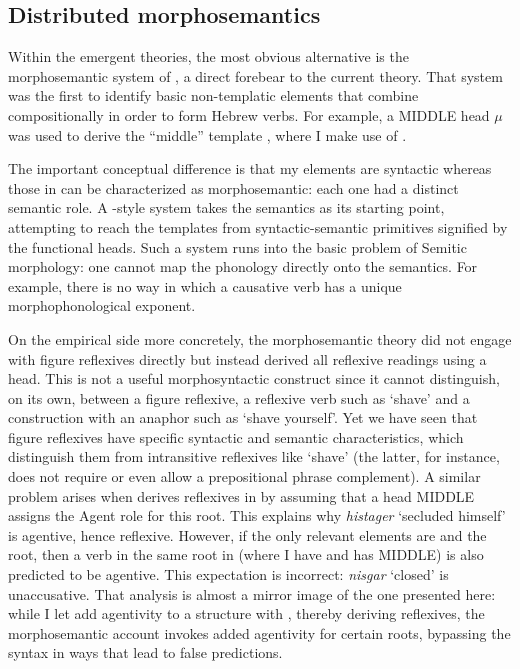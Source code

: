 {{	\subsection{Distributed morphosemantics \citep{doron03}} \label{vz:others:ed}
Within the emergent theories, the most obvious alternative is the morphosemantic system of \cite{doron03}, a direct forebear to the current theory. That system was the first to identify basic non-templatic elements that combine compositionally in order to form Hebrew verbs. For example, a MIDDLE head $\mu$ was used to derive the ``middle'' template {\tnif}, where I make use of {\vz}.

The important conceptual difference is that my elements are syntactic whereas those in \cite{doron03} can be characterized as morphosemantic: each one had a distinct semantic role. A \citeauthor{doron03}-style system takes the semantics as its starting point, attempting to reach the templates from syntactic-semantic primitives signified by the functional heads. Such a system runs into the basic problem of Semitic morphology: one cannot map the phonology directly onto the semantics. For example, there is no way in which a causative verb has a unique morphophonological exponent.

On the empirical side more concretely, the morphosemantic theory did not engage with figure reflexives directly but instead derived all reflexive readings using a  head. This is not a useful morphosyntactic construct since it cannot distinguish, on its own, between a figure reflexive, a reflexive verb such as `shave’ and a construction with an anaphor such as `shave yourself’. Yet we have seen that figure reflexives have specific syntactic and semantic characteristics, which distinguish them from intransitive reflexives like `shave’ (the latter, for instance, does not require or even allow a prepositional phrase complement). A similar problem arises when \citet[60]{doron03} derives reflexives in {\thit} by assuming that a head MIDDLE assigns the Agent role for this root. This explains why \emph{histager} `secluded himself' is agentive, hence reflexive. However, if the only relevant elements are {\vz} and the root, then a verb in the same root in {\tnif} (where I have {\vz} and \citealt{doron03} has MIDDLE) is also predicted to be agentive. This expectation is incorrect: \emph{nisgar} `closed' is unaccusative. That analysis is almost a mirror image of the one presented here: while I let {\va} add agentivity to a structure with \vz, thereby deriving reflexives, the morphosemantic account invokes added agentivity for certain roots, bypassing the syntax in ways that lead to false predictions.

}}
